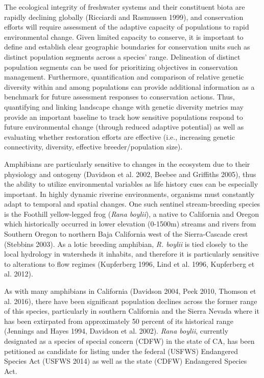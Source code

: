 \documentclass[twoside,12pt,final]{ucthesis-CA2012} %
\begin{document}
\begin{ucmainmatter}
The ecological integrity of freshwater systems and their constituent
biota are rapidly declining globally (Ricciardi and Rasmussen 1999), and
conservation efforts will require assessment of the adaptive capacity of
populations to rapid environmental change. Given limited capacity to
conserve, it is important to define and establish clear geographic
boundaries for conservation units such as distinct population segments
across a species' range. Delineation of distinct population segments can
be used for prioritizing objectives in conservation management.
Furthermore, quantification and comparison of relative genetic diversity
within and among populations can provide additional information as a
benchmark for future assessment responses to conservation actions. Thus,
quantifying and linking landscape change with genetic diversity metrics
may provide an important baseline to track how sensitive populations
respond to future environmental change (through reduced adaptive
potential) as well as evaluating whether restoration efforts are
effective (i.e., increasing genetic connectivity, diversity, effective
breeder/population size).

Amphibians are particularly sensitive to changes in the ecosystem due to
their physiology and ontogeny (Davidson et al. 2002, Beebee and
Griffiths 2005), thus the ability to utilize environmental variables as
life history cues can be especially important. In highly dynamic
riverine environments, organisms must constantly adapt to temporal and
spatial changes. One such sentinel stream-breeding species is the
Foothill yellow-legged frog (\emph{Rana boylii}), a native to California
and Oregon which historically occurred in lower elevation (0-1500m)
streams and rivers from Southern Oregon to northern Baja California west
of the Sierra-Cascade crest (Stebbins 2003). As a lotic breeding
amphibian, \emph{R. boylii} is tied closely to the local hydrology in
watersheds it inhabits, and therefore it is particularly sensitive to
alterations to flow regimes (Kupferberg 1996, Lind et al. 1996,
Kupferberg et al. 2012).

As with many amphibians in California (Davidson 2004, Peek 2010, Thomson
et al. 2016), there have been significant population declines across the
former range of this species, particularly in southern California and
the Sierra Nevada where it has been extirpated from approximately 50
percent of its historical range (Jennings and Hayes 1994, Davidson et
al. 2002). \emph{Rana boylii}, currently designated as a species of
special concern (CDFW) in the state of CA, has been petitioned as
candidate for listing under the federal (USFWS) Endangered Species Act
(USFWS 2014) as well as the state (CDFW) Endangered Species Act.


\end{ucmainmatter}
\end{document}
